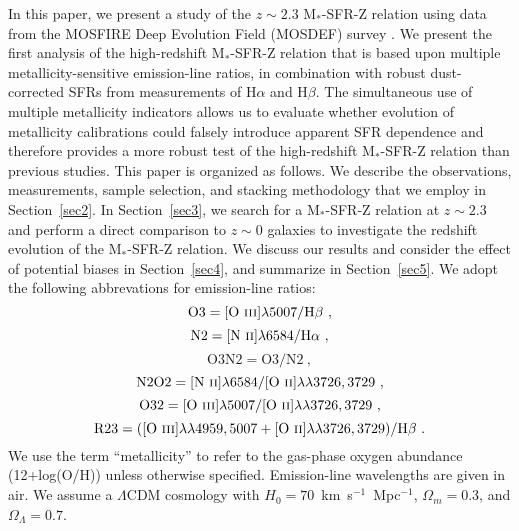 \documentclass[iop,twocolappendix]{emulateapj}
\newcommand{\mstar}{$\mbox{M}_*$}
\begin{document}
In this paper, we present a study of the $z\sim2.3$ \mstar-SFR-Z relation using data from the
 MOSFIRE Deep Evolution Field (MOSDEF) survey \citep{kri15}.  We present the first analysis of the high-redshift
 \mstar-SFR-Z relation that is based upon multiple metallicity-sensitive emission-line ratios,
 in combination with robust dust-corrected SFRs from measurements of H$\alpha$ and H$\beta$.
  The simultaneous use of multiple metallicity indicators allows us to evaluate whether evolution
 of metallicity calibrations could falsely introduce apparent SFR dependence and therefore provides a more
 robust test of the high-redshift \mstar-SFR-Z relation than previous studies.
  This paper is organized as follows.  We describe the observations, measurements, sample selection,
 and stacking methodology that we employ in Section~\ref{sec2}.
  In Section~\ref{sec3}, we search for a \mstar-SFR-Z relation at $z\sim2.3$ and
 perform a direct comparison to $z\sim0$ galaxies to investigate the redshift evolution of the \mstar-SFR-Z relation.
  We discuss our results and consider the effect of potential biases in Section~\ref{sec4},
 and summarize in Section~\ref{sec5}.  We adopt the following abbrevations for emission-line
 ratios:
\begin{equation}
\text{O}3 = [\mbox{O}~\textsc{iii}]\lambda5007/\text{H}\beta\ ,
\end{equation}
\begin{equation}
\text{N}2 = [\mbox{N}~\textsc{ii}]\lambda6584/\text{H}\alpha\ ,
\end{equation}
\begin{equation}
\text{O3N}2 = \text{O3}/\text{N2}\ ,
\end{equation}
\begin{equation}
\text{N2O2} = [\mbox{N}~\textsc{ii}]\lambda6584/[\text{O}~\textsc{ii}]\lambda\lambda3726,3729\ ,
\end{equation}
\begin{equation}
\text{O}32 = [\mbox{O}~\textsc{iii}]\lambda5007/[\text{O}~\textsc{ii}]\lambda\lambda3726,3729\ ,
\end{equation}
\begin{equation}
\text{R}23 = ([\mbox{O}~\textsc{iii}]\lambda\lambda4959,5007+[\text{O}~\textsc{ii}]\lambda\lambda3726,3729)/\text{H}\beta\ .
\end{equation}
We use the term ``metallicity'' to refer to the gas-phase oxygen abundance (12+log(O/H)) unless
 otherwise specified.  Emission-line wavelengths are given in air.
  We assume a $\Lambda$CDM cosmology with $H_0=70$~km~s$^{-1}$~Mpc$^{-1}$,
 $\Omega_m=0.3$, and $\Omega_{\Lambda}=0.7$.
\end{document}
